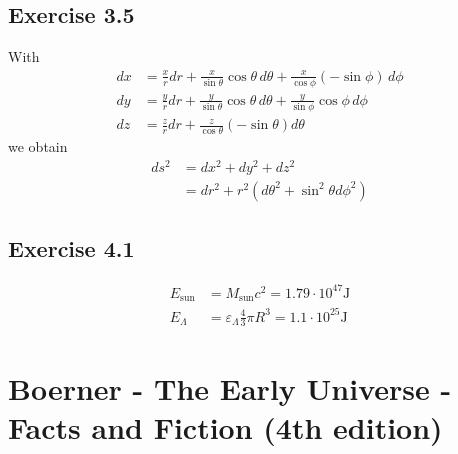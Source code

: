 \documentclass[10pt,a4paper]{book}
\theoremstyle{definition}
\begin{document}
\subsection{Exercise 3.5}
With
\begin{align}
dx&=\frac{x}{r}dr+\frac{x}{\sin\theta}\cos\theta\,d\theta+\frac{x}{\cos\phi}(-\sin\phi)\,d\phi\\
dy&=\frac{y}{r}dr+\frac{y}{\sin\theta}\cos\theta\,d\theta+\frac{y}{\sin\phi}\cos\phi\,d\phi\\
dz&=\frac{z}{r}dr+\frac{z}{\cos\theta}(-\sin\theta)d\theta
\end{align}
we obtain
\begin{align}
ds^2&=dx^2+dy^2+dz^2\\
&=dr^2+r^2(d\theta^2+\sin^2\theta d\phi^2)
\end{align}

\subsection{Exercise 4.1}
\begin{align}
E_\text{sun}&=M_\text{sun}c^2=1.79\cdot10^{47}\text{J}\\
E_\Lambda&=\varepsilon_\Lambda\frac{4}{3}\pi R^3=1.1\cdot10^{25}\text{J}
\end{align}



\section{{\sc Boerner} - The Early Universe - Facts and Fiction (4th edition)}
\end{document}
